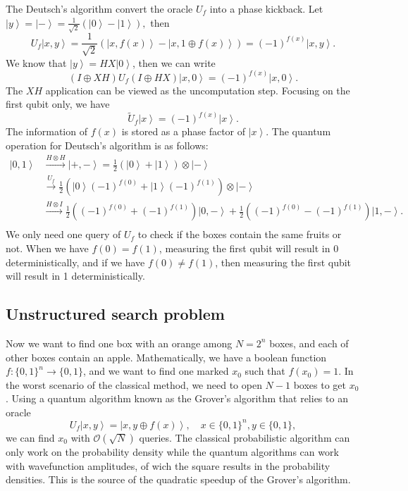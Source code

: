 \documentclass[11pt]{article}
\newcommand{\ket}[1]{\left|#1\right\rangle}
\begin{document}
The Deutsch's algorithm convert the oracle $U_f$ into a phase kickback. Let $\ket{y} = \ket{-} = \frac{1}{\sqrt{2}}(\ket{0} - \ket{1}),$ then
\begin{equation}
    U_f\ket{x,y} = \frac{1}{\sqrt{2}}(\ket{x,f(x)} - \ket{x,1\oplus f(x)}) = (-1)^{f(x)}\ket{x,y}.
\end{equation}
We know that $\ket{y} = HX\ket{0}$, then we can write 
\begin{equation}
    (I\oplus XH)U_f(I\oplus HX)\ket{x,0} = (-1)^{f(x)}\ket{x,0}.
\end{equation}
The $XH$ application can be viewed as the uncomputation step. Focusing on the first qubit only, we have 
\begin{equation}
    \tilde{U}_f\ket{x} = (-1)^{f(x)}\ket{x}.
\end{equation}
The information of $f(x)$ is stored as a phase factor of $\ket{x}$. The quantum operation for Deutsch's algorithm is as follows:
\begin{align}
        \ket{0,1} &\xrightarrow{H\otimes H}{\ket{+,-}} = \frac{1}{2}(\ket{0}+\ket{1})\otimes\ket{-}  \nonumber \\
        &\xrightarrow{U_f}{\frac{1}{2}(\ket{0}(-1)^{f(0)} + \ket{1}(-1)^{f(1)})\otimes\ket{-}} \nonumber\\
        &\xrightarrow{H\otimes I}\frac{1}{2}((-1)^{f(0)} + (-1)^{f(1)})\ket{0,-} + \frac{1}{2}((-1)^{f(0)} - (-1)^{f(1)})\ket{1,-}. \nonumber\\
\end{align}
We only need one query of $U_f$ to check if the boxes contain the same fruits or not. When we have $f(0) = f(1)$, measuring the first qubit will result in 0 deterministically, and if we have $f(0) \neq f(1)$, then measuring the first qubit
will result in 1 deterministically. 

\subsection{Unstructured search problem}
Now we want to find one box with an orange among $N = 2^n$ boxes, and each of other boxes contain an apple. Mathematically, we have a boolean function $f: \{0,1\}^n \rightarrow \{0,1\}$, and we want to find one marked $x_0$ such that $f(x_0) = 1$. In the worst scenario of the classical method, 
we need to open $N-1$ boxes to get $x_0$. Using a quantum algorithm known as the Grover's algorithm that relies to an oracle 
\begin{equation}
    U_f\ket{x,y} = \ket{x, y\oplus f(x)}, \quad x \in \{0,1\}^n, y \in \{0,1\},
\end{equation}
we can find $x_0$ with $\mathcal{O}(\sqrt{N})$ queries. The classical probabilistic algorithm can only work on the probability density while the quantum algorithms can work with 
wavefunction amplitudes, of wich the square results in the probability densities. This is the source of  the quadratic speedup of the Grover's algorithm. 
\end{document}
